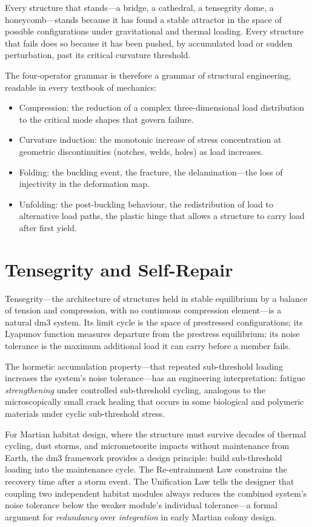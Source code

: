 \documentclass[12pt, oneside]{book}
\theoremstyle{plain}
\theoremstyle{definition}
\theoremstyle{remark}
\begin{document}
Every structure that stands---a bridge, a cathedral, a tensegrity
dome, a honeycomb---stands because it has found a stable attractor
in the space of possible configurations under gravitational and
thermal loading. Every structure that fails does so because it has
been pushed, by accumulated load or sudden perturbation, past its
critical curvature threshold.

The four-operator grammar is therefore a grammar of structural
engineering, readable in every textbook of mechanics:
\begin{itemize}
  \item Compression: the reduction of a complex three-dimensional
    load distribution to the critical mode shapes that govern
    failure.
  \item Curvature induction: the monotonic increase of stress
    concentration at geometric discontinuities (notches, welds,
    holes) as load increases.
  \item Folding: the buckling event, the fracture, the
    delamination---the loss of injectivity in the deformation
    map.
  \item Unfolding: the post-buckling behaviour, the redistribution
    of load to alternative load paths, the plastic hinge that
    allows a structure to carry load after first yield.
\end{itemize}

\section{Tensegrity and Self-Repair}

Tensegrity---the architecture of structures held in stable
equilibrium by a balance of tension and compression, with no
continuous compression element---is a natural dm3 system. Its
limit cycle is the space of prestressed configurations; its
Lyapunov function measures departure from the prestress
equilibrium; its noise tolerance is the maximum additional
load it can carry before a member fails.

The hormetic accumulation property---that repeated sub-threshold
loading increases the system's noise tolerance---has an
engineering interpretation: fatigue \emph{strengthening} under
controlled sub-threshold cycling, analogous to the microscopically
small crack healing that occurs in some biological and polymeric
materials under cyclic sub-threshold stress.

For Martian habitat design, where the structure must survive
decades of thermal cycling, dust storms, and micrometeorite
impacts without maintenance from Earth, the dm3 framework
provides a design principle: build sub-threshold loading into
the maintenance cycle. The Re-entrainment Law constrains the
recovery time after a storm event. The Unification Law tells
the designer that coupling two independent habitat modules
always reduces the combined system's noise tolerance below
the weaker module's individual tolerance---a formal argument
for \emph{redundancy} over \emph{integration} in early
Martian colony design.
\end{document}

